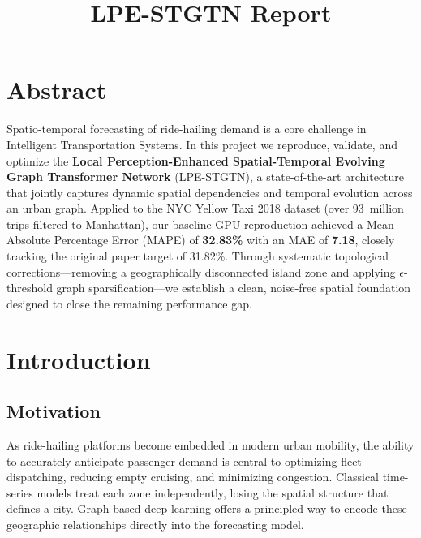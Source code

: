 \documentclass{rapportECL}
\title{LPE-STGTN Report}
\begin{document}





\fairemarges
\fairepagedegarde
\tabledematieres

\section*{Abstract}

Spatio-temporal forecasting of ride-hailing demand is a core challenge in Intelligent Transportation Systems. In this project we reproduce, validate, and optimize the \textbf{Local Perception-Enhanced Spatial-Temporal Evolving Graph Transformer Network} (LPE-STGTN), a state-of-the-art architecture that jointly captures dynamic spatial dependencies and temporal evolution across an urban graph. Applied to the NYC Yellow Taxi 2018 dataset (over 93~million trips filtered to Manhattan), our baseline GPU reproduction achieved a Mean Absolute Percentage Error (MAPE) of \textbf{32.83\%} with an MAE of \textbf{7.18}, closely tracking the original paper target of 31.82\%. Through systematic topological corrections---removing a geographically disconnected island zone and applying $\epsilon$-threshold graph sparsification---we establish a clean, noise-free spatial foundation designed to close the remaining performance gap.

\section{Introduction}

\subsection{Motivation}
As ride-hailing platforms become embedded in modern urban mobility, the ability to accurately anticipate passenger demand is central to optimizing fleet dispatching, reducing empty cruising, and minimizing congestion. Classical time-series models treat each zone independently, losing the spatial structure that defines a city. Graph-based deep learning offers a principled way to encode these geographic relationships directly into the forecasting model.
\end{document}
